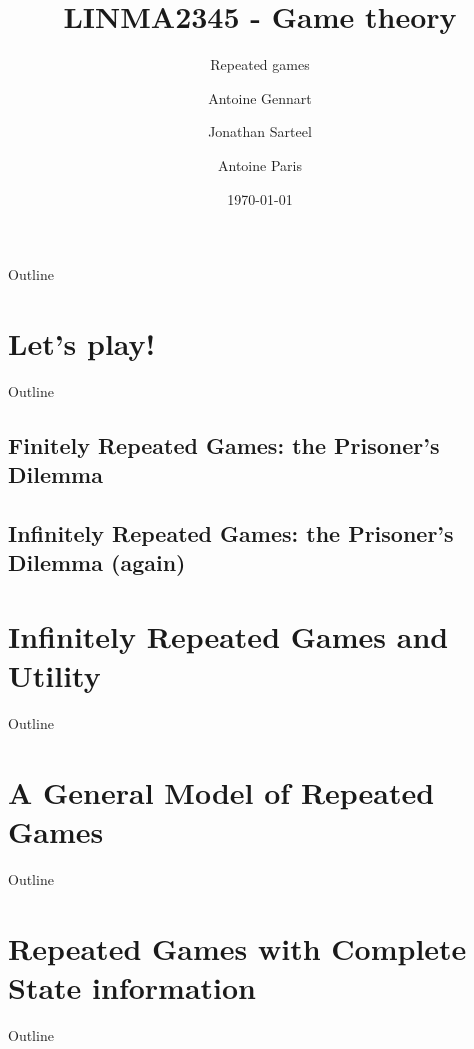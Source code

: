 \documentclass[10pt]{beamer}
\title{LINMA2345 - Game theory}
\subtitle{Repeated games}
\date{\today}
\author{Antoine Gennart\and Jonathan Sarteel\and Antoine Paris}
\institute{Ecole polytechnique de Louvain}
\begin{document}
\maketitle


\begin{frame}{Outline}
    \tableofcontents
\end{frame}

\section{Let's play!}
\begin{frame}{Outline}
    \tableofcontents[currentsection]
\end{frame}

\subsection{Finitely Repeated Games: the Prisoner's Dilemma}


\subsection{Infinitely Repeated Games: the Prisoner's Dilemma (again)}



\section{Infinitely Repeated Games and Utility}
\begin{frame}{Outline}
    \tableofcontents[currentsection]
\end{frame}



\section{A General Model of Repeated Games}
\begin{frame}{Outline}
    \tableofcontents[currentsection]
\end{frame}



\section{Repeated Games with Complete State information}
\begin{frame}{Outline}
    \tableofcontents[currentsection]
\end{frame}
\end{document}
